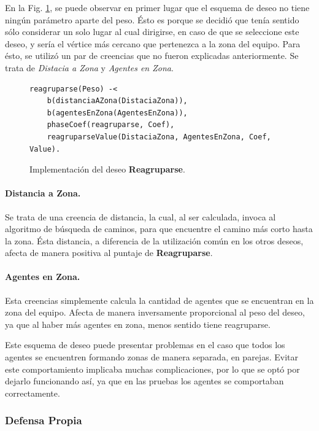\documentclass[oneside]{book}
\theoremstyle{definition}
\theoremstyle{example}
\begin{document}
En la Fig. \ref{fig:deseoReagruparse}, se puede observar en primer lugar que el esquema 
de deseo no tiene ningún parámetro aparte del peso. Ésto es porque se decidió que tenía 
sentido sólo considerar un solo lugar al cual dirigirse, en caso de que se seleccione 
este deseo, y sería el vértice más cercano que pertenezca a la zona del equipo. Para 
ésto, se utilizó un par de creencias que no fueron explicadas anteriormente. Se trata de 
\textit{Distacia a Zona} y \textit{Agentes en Zona}.


\begin{figure}
\begin{verbatim}
reagruparse(Peso) -< 
    b(distanciaAZona(DistaciaZona)),
	b(agentesEnZona(AgentesEnZona)),
    phaseCoef(reagruparse, Coef),
    reagruparseValue(DistaciaZona, AgentesEnZona, Coef, Value).
\end{verbatim}
\caption{Implementación del deseo \textbf{Reagruparse}.}
\label{fig:deseoReagruparse}
\end{figure}


\paragraph{Distancia a Zona.}

Se trata de una creencia de distancia, la cual, al ser calculada, invoca al algoritmo
de búsqueda de caminos, para que encuentre el camino más corto hasta la zona. Ésta 
distancia, a diferencia de la utilización común en los otros deseos, afecta de manera 
positiva al puntaje de \textbf{Reagruparse}.

\paragraph{Agentes en Zona.}

Esta creencias simplemente calcula la cantidad de agentes que se encuentran en la zona
del equipo. Afecta de manera inversamente proporcional al peso del deseo, ya que al 
haber más agentes en zona, menos sentido tiene reagruparse.

\vspace{\baselineskip} 
Este esquema de deseo puede presentar problemas en el caso que todos los agentes se 
encuentren formando zonas de manera separada, en parejas. Evitar este comportamiento
implicaba muchas complicaciones, por lo que se optó por dejarlo funcionando así, ya
que en las pruebas los agentes se comportaban correctamente.


\subsubsection{Defensa Propia}
\end{document}
